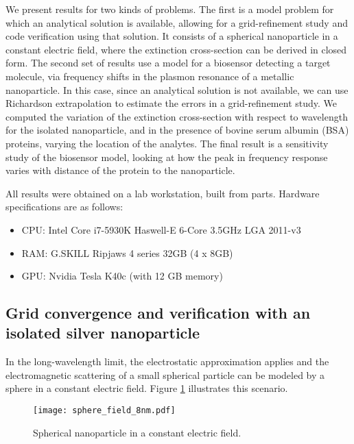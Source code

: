 
We present results for two kinds of problems. 
The first is a model problem for which an analytical solution is available, 
allowing for a grid-refinement study and code verification using that solution.
It consists of a spherical nanoparticle in a constant electric field, 
where the extinction cross-section can be derived in closed form.
The second set of results use a model for a biosensor detecting a target molecule, 
via frequency shifts in the plasmon resonance of a metallic nanoparticle. 
In this case, since an analytical solution is not available, we can use Richardson 
extrapolation to estimate the errors in a grid-refinement study.
We computed the variation of the extinction cross-section with respect to wavelength
for the isolated nanoparticle, and in the presence of bovine serum albumin (BSA) proteins, 
varying the location of the analytes.
The final result is a sensitivity study of the biosensor model, 
looking at how the peak in frequency response varies with distance of the protein 
to the nanoparticle.

All results were obtained on a lab workstation, built from parts.
Hardware specifications are as follows: 
\begin{itemize}
  \item CPU: Intel Core i7-5930K Haswell-E 6-Core 3.5GHz LGA 2011-v3
  \item RAM: G.SKILL Ripjaws 4 series 32GB (4 x 8GB)
  \item GPU: Nvidia Tesla K40c (with 12 GB memory)
\end{itemize}

\subsection{Grid convergence and verification with an isolated silver nanoparticle} \label{sec:verification}

\noindent In the long-wavelength limit, the electrostatic approximation applies and
the electromagnetic scattering of a small spherical particle can be modeled
by a sphere in a constant electric field. 
Figure \ref{fig:np_elec_field} illustrates this scenario.

%
\begin{figure}[h] %
   \centering
   \texttt{[image: sphere\_field\_8nm.pdf]} 
   \caption{Spherical nanoparticle in a constant electric field.}
   \label{fig:np_elec_field}
\end{figure}
%

